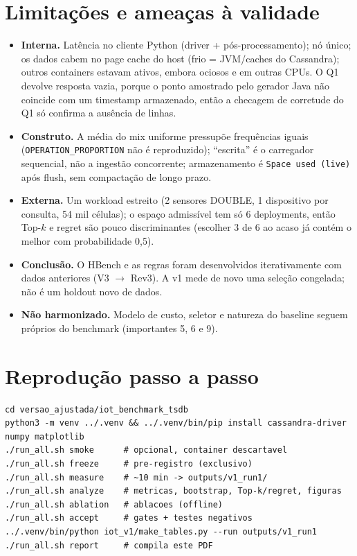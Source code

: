 \documentclass[11pt,a4paper]{article}
\begin{document}
\section{Limitações e ameaças à validade}
\begin{itemize}
\item \textbf{Interna.} Latência no cliente Python (driver + pós-processamento); nó único; os dados cabem no page cache do host (frio = JVM/caches do Cassandra); outros containers estavam ativos, embora ociosos e em outras CPUs. O Q1 devolve resposta vazia, porque o ponto amostrado pelo gerador Java não coincide com um timestamp armazenado, então a checagem de corretude do Q1 só confirma a ausência de linhas.
\item \textbf{Construto.} A média do mix uniforme pressupõe frequências iguais (\texttt{OPERATION\_PROPORTION} não é reproduzido); ``escrita'' é o carregador sequencial, não a ingestão concorrente; armazenamento é \texttt{Space used (live)} após flush, sem compactação de longo prazo.
\item \textbf{Externa.} Um workload estreito (2 sensores DOUBLE, 1 dispositivo por consulta, 54 mil células); o espaço admissível tem só 6 deployments, então Top-$k$ e regret são pouco discriminantes (escolher 3 de 6 ao acaso já contém o melhor com probabilidade 0,5).
\item \textbf{Conclusão.} O HBench e as regras foram desenvolvidos iterativamente com dados anteriores (V3 $\rightarrow$ Rev3). A v1 mede de novo uma seleção congelada; não é um holdout novo de dados.
\item \textbf{Não harmonizado.} Modelo de custo, seletor e natureza do baseline seguem próprios do benchmark (importantes 5, 6 e 9).
\end{itemize}

\appendix
\section{Reprodução passo a passo}
\begin{verbatim}
cd versao_ajustada/iot_benchmark_tsdb
python3 -m venv ../.venv && ../.venv/bin/pip install cassandra-driver numpy matplotlib
./run_all.sh smoke      # opcional, container descartavel
./run_all.sh freeze     # pre-registro (exclusivo)
./run_all.sh measure    # ~10 min -> outputs/v1_run1/
./run_all.sh analyze    # metricas, bootstrap, Top-k/regret, figuras
./run_all.sh ablation   # ablacoes (offline)
./run_all.sh accept     # gates + testes negativos
../.venv/bin/python iot_v1/make_tables.py --run outputs/v1_run1
./run_all.sh report     # compila este PDF
\end{verbatim}
\end{document}
